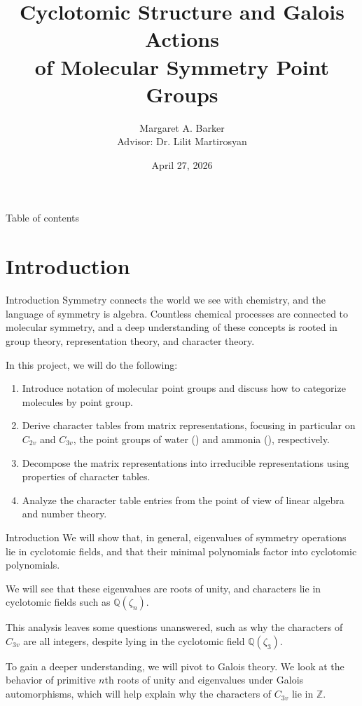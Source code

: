 \documentclass{beamer}
\title[Molecular Symmetry Point Groups]{Cyclotomic Structure and Galois Actions\\of Molecular Symmetry Point Groups}
\author[Margaret A. Barker]{\texorpdfstring{Margaret A. Barker\\Advisor: Dr. Lilit Martirosyan}{Margaret A. Barker, Advisor: Dr. Lilit Martirosyan}}
\institute[UNCW]{University of North Carolina Wilmington\\Department of Mathematics and Statistics}
\date[April 27, 2026]{April 27, 2026}
\newcommand{\vs}{\vspace{5mm}}
\begin{document}
    \frame{\titlepage}
    
    \begin{frame}{Table of contents}
        \tableofcontents[sections=1-8]
    \end{frame}

    \section{Introduction}

    \begin{frame}{Introduction}
    Symmetry connects the world we see with chemistry, and the language of symmetry is algebra. Countless chemical processes are connected to molecular symmetry, and a deep understanding of these concepts is rooted in group theory, representation theory, and character theory.
    \vs

    {
        In this project, we will do the following:
        \begin{enumerate}
            \item Introduce notation of molecular point groups and discuss how to categorize molecules by point group.
            \item Derive character tables from matrix representations, focusing in particular on $C_{2v}$ and $C_{3v}$, the point groups of water () and ammonia (), respectively.
            \item Decompose the matrix representations into irreducible representations using properties of character tables.
            \item Analyze the character table entries from the point of view of linear algebra and number theory.
        \end{enumerate}
    }
    \end{frame}

    \begin{frame}{Introduction}
        We will show that, in general, eigenvalues of symmetry operations lie in cyclotomic fields, and that their minimal polynomials factor into cyclotomic polynomials.
        \vs
    
        {
            We will see that these eigenvalues are roots of unity, and characters lie in cyclotomic fields such as $\mathbb{Q}(\zeta_n)$.
        }
        \vs
    
        {
            This analysis leaves some questions unanswered, such as why the characters of $C_{3v}$ are all integers, despite lying in the cyclotomic field $\mathbb{Q}(\zeta_3)$.
        }
        \vs
    
        {
            To gain a deeper understanding, we will pivot to Galois theory. We look at the behavior of primitive $n$th roots of unity and eigenvalues under Galois automorphisms, which will help explain why the characters of $C_{3v}$ lie in $\mathbb{Z}$.
        }
    \end{frame}
\end{document}
